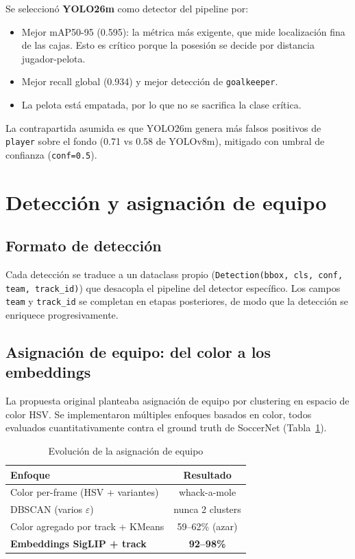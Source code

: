 \documentclass[conference]{IEEEtran}
\begin{document}
Se seleccionó \textbf{YOLO26m} como detector del pipeline por:
\begin{itemize}
    \item Mejor mAP50-95 (0.595): la métrica más exigente, que mide
    localización fina de las cajas. Esto es crítico porque la posesión se
    decide por distancia jugador-pelota.
    \item Mejor recall global (0.934) y mejor detección de
    \texttt{goalkeeper}.
    \item La pelota está empatada, por lo que no se sacrifica la clase
    crítica.
\end{itemize}

La contrapartida asumida es que YOLO26m genera más falsos positivos de
\texttt{player} sobre el fondo (0.71 vs 0.58 de YOLOv8m), mitigado con
umbral de confianza (\texttt{conf=0.5}).

\section{Detección y asignación de equipo}
\label{sec:deteccion}

\subsection{Formato de detección}

Cada detección se traduce a un dataclass propio
(\texttt{Detection(bbox, cls, conf, team, track\_id)}) que desacopla el
pipeline del detector específico. Los campos \texttt{team} y
\texttt{track\_id} se completan en etapas posteriores, de modo que la
detección se enriquece progresivamente.

\subsection{Asignación de equipo: del color a los embeddings}

La propuesta original planteaba asignación de equipo por clustering en
espacio de color HSV. Se implementaron múltiples enfoques basados en color,
todos evaluados cuantitativamente contra el ground truth de SoccerNet
(Tabla~\ref{tab:team_evolution}).

\begin{table}[htbp]
\caption{Evolución de la asignación de equipo}
\begin{center}
\begin{tabular}{lc}
\toprule
\textbf{Enfoque} & \textbf{Resultado} \\
\midrule
Color per-frame (HSV + variantes) & whack-a-mole \\
DBSCAN (varios $\varepsilon$) & nunca 2 clusters \\
Color agregado por track + KMeans & 59--62\% (azar) \\
\textbf{Embeddings SigLIP + track} & \textbf{92--98\%} \\
\bottomrule
\end{tabular}
\label{tab:team_evolution}
\end{center}
\end{table}
\end{document}
